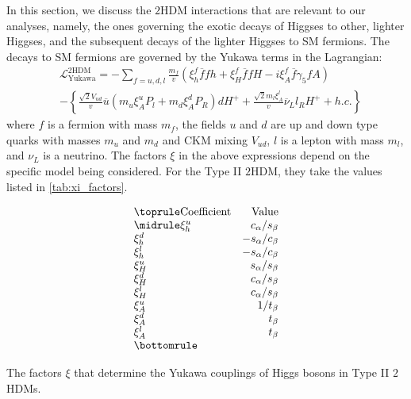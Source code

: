 In this section, we discuss the $2$HDM interactions that are relevant to our analyses, namely, the ones governing the exotic decays of Higgses to other, lighter Higgses, and the subsequent decays of the lighter Higgses to SM fermions. The decays to SM fermions are governed by the Yukawa terms in the Lagrangian:
\begin{align*}
&\mathcal{L}^{\mathrm{2HDM}}_{\text{Yukawa}} = - \sum_{f = u, d, l} \frac{m_f}{v}
\left(\xi_h^f \overline{f}fh+\xi_H^f \overline{f}fH-i\xi_A^f \overline{f}\gamma_5fA \right)\\
&-\left\{\frac{\sqrt{2}V_{ud}}{v}\overline{u}\left(m_u\xi_A^uP_l+m_d\xi_A^dP_R\right)dH^+ + \frac{\sqrt{2}m_l\xi^l_A}{v}\overline{\nu}_Ll_RH^+ + h.c.\right\}
\label{eq:2HDM_Yukawa_couplings}
\end{align*}
where $f$ is a fermion with mass $m_f$, the fields $u$ and $d$ are up and down type quarks with masses $m_u$ and $m_d$ and CKM mixing $V_{ud}$, $l$ is a lepton with mass $m_l$, and $\nu_L$ is a neutrino. 
The factors $\xi$ in the above expressions depend on the specific model being considered. For the Type II $2$HDM, they take the values listed in \autoref{tab:xi_factors}.
\begin{margintable}[2in]
  \[
    \begin{array}{lr}
      \toprule
      \text{Coefficient}       & \text{Value} \\
      \midrule
      \xi_{h}^u   & \casb          \\
      \xi_{h}^d   & -\sacb         \\
      \xi_{h}^l   & -\sacb         \\
      \xi_{H}^u   & \sasb          \\
      \xi_{H}^d   & \casb          \\
      \xi_{H}^l   & \casb          \\
      \xi_{A}^u   & 1/t_\beta      \\
      \xi_{A}^d   & t_\beta        \\
      \xi_{A}^l   & t_\beta\\      
      \bottomrule
\end{array}
\]
\caption{The factors $\xi$ that determine the Yukawa couplings of Higgs bosons in Type II $2$HDMs.}
\label{tab:xi_factors}
\end{margintable}

